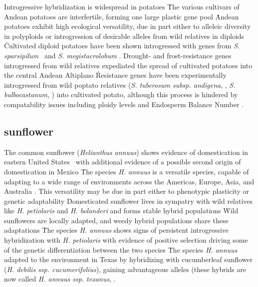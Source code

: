 \documentclass[11pt]{article}
\begin{document}
Introgressive hybridization is widespread in potatoes \cite{grun1990evolution}\.
The various cultivars of Andean potatoes are interfertile, forming one large plastic gene pool \cite{quiros1992increase}\.
Andean potatoes exhibit high ecological versatility, due in part either to alleleic diversity in polyploids or introgression of desirable alleles from wild relatives in diploids \cite{zimmerer1998ecogeography}\.
Cultivated diploid potatoes have been shown introgressed with genes from \emph{S. sparsipilum} \cite{rabinowitz1990high}\ and \emph{S. megistacrolobum} \cite{johns1987relationships, huaman1980solanum}.
Drought- and frost-resistance genes introgressed from wild relatives expediated the spread of cultivated potatoes into the central Andean Altiplano \cite{johns1986ongoing, hawkes1962origin, schmiediche1980breeding}\.
Resistance genes have been experimentally introgressed from wild poptato relatives (\emph{S. tuberosum subsp. andigena}, \cite{van1999tight}, \emph{S. bulbocastanum}, \cite{van2003ancient}) into cultivated potato, although this process is hindered by compatability issues including ploidy levels and Endosperm Balance Number \cite{johnston1980significance}.





\subsection*{sunflower}

The common sunflower (\emph{Helianthus annuus}) shows evidence of domestication in eastern United States \cite{harter2004origin, wills2006chloroplast}\, with additional evidence of a possible second origin of domestication in Mexico \cite{lentz2008sunflower}\.
The species \emph{H. annuus} is a versatile species, capable of adapting to a wide range of environments across the Americas, Europe, Asia, and Australia \cite{kane2008genetics}.
This versatility may be due in part either to phenotypic plasticity or genetic adaptability \cite{maron2004rapid}\.
Domesticated sunflower lives in sympatry with wild relatives like \emph{H. petiolaris} and \emph{H. bolanderi} and forms stable hybrid populations \cite{schwarzbach2002likely, rieseberg1988molecular, welch2002patterns}\.
Wild sunflowers are locally adapted, and weedy hybrid populations share these adaptations \cite{kane2008genetics}\.
The species \emph{H. annuus} shows signs of persistent introgressive hybridization with \emph{H. petiolaris} with evidence of positive selection driving some of the genetic differentiation between the two species \cite{yatabe2007rampant}\.
The species \emph{H. annuus} adapted to the environment in Texas by hybridizing with cucumberleaf sunflower (\emph{H. debilis ssp. cucumerifolius}), gaining advantageous alleles (these hybrids are now called \emph{H. annuus ssp. texanus}, \cite{kim1999genetic, heiser1951hybridization, rieseberg1999hybrid, rieseberg1990helianthus}.
\end{document}
